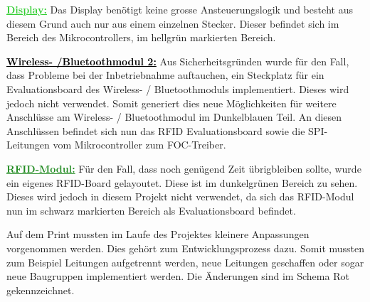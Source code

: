 \textcolor{LimeGreen}{\textbf{\underline{Display:}}}
Das Display benötigt keine grosse Ansteuerungslogik und besteht aus diesem Grund auch nur aus einem einzelnen Stecker. Dieser befindet sich im Bereich des Mikrocontrollers, im hellgrün markierten Bereich.

\textcolor{black}{\textbf{\underline{Wireless- /Bluetoothmodul 2:}}}
Aus Sicherheitsgründen wurde für den Fall, dass Probleme bei der Inbetriebnahme auftauchen, ein Steckplatz für ein Evaluationsboard des Wireless- / Bluetoothmoduls implementiert. Dieses wird jedoch nicht verwendet. Somit generiert dies neue Möglichkeiten für weitere Anschlüsse am Wireless- / Bluetoothmodul im Dunkelblauen Teil. An diesen Anschlüssen befindet sich nun das RFID Evaluationsboard sowie die SPI-Leitungen vom Mikrocontroller zum FOC-Treiber. 

\textcolor{ForestGreen}{\textbf{\underline{RFID-Modul:}}}
Für den Fall, dass noch genügend Zeit übrigbleiben sollte, wurde ein eigenes RFID-Board gelayoutet. Diese ist im dunkelgrünen Bereich zu sehen. Dieses wird jedoch in diesem Projekt nicht verwendet, da sich das RFID-Modul nun im schwarz markierten Bereich als Evaluationsboard befindet. 

Auf dem Print mussten im Laufe des Projektes kleinere Anpassungen vorgenommen werden. Dies gehört zum Entwicklungsprozess dazu. Somit mussten zum Beispiel Leitungen aufgetrennt werden, neue Leitungen geschaffen oder sogar neue Baugruppen implementiert werden. Die Änderungen sind im Schema Rot gekennzeichnet.